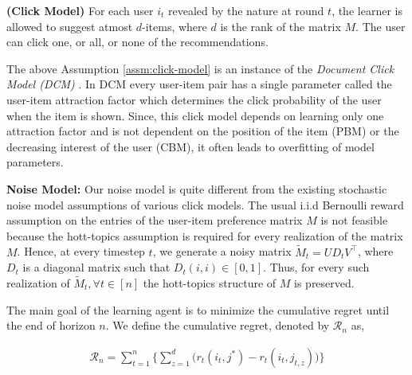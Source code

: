 \begin{assumption}\textbf{(Click Model)}
\label{assm:click-model}
For each user $i_t$ revealed by the nature at round $t$, the learner is allowed to suggest atmost $d$-items, where $d$ is the rank of the matrix $M$. The user can click one, or all, or none of the recommendations. 
\end{assumption}

\begin{discussion}
The above Assumption \ref{assm:click-model} is an instance of the \textit{Document Click Model (DCM)} \citep{craswell2008experimental}. In DCM every user-item pair has a single parameter called the user-item attraction factor which determines the click probability of the user when the item is shown. Since, this click model depends on learning only one attraction factor and is not dependent on the position of the item (PBM) or the decreasing interest of the user (CBM), it often leads to overfitting of model parameters. 
\end{discussion}


\textbf{Noise Model:} Our noise model is quite different from the existing stochastic noise model assumptions of various click models. The usual i.i.d Bernoulli reward assumption on the entries of the user-item preference matrix $M$ is not feasible because the hott-topics assumption is required for every realization of the matrix $M$. Hence,  at every timestep $t$, we generate a noisy matrix $\tilde{M}_t = UD_t V^{\intercal}$, where $D_t$ is a diagonal matrix such that $D_t(i,i)\in[0,1]$. Thus, for every such realization of $\tilde{M}_t, \forall t\in [n]$ the hott-topics structure of $M$ is preserved.

The main goal of the learning agent is to minimize the cumulative regret until the end of horizon $n$. We define the cumulative regret, denoted by $\mathcal{R}_n$ as,

\begin{align*}
\mathcal{R}_n = \sum_{t=1}^{n}\bigg\lbrace \sum_{z=1}^{d} \bigg( r_{t}\left(i_{t}, j^* \right) - r_{t}\left( i_{t}, j_{t,z}\right)\bigg)\bigg\rbrace
\end{align*}

